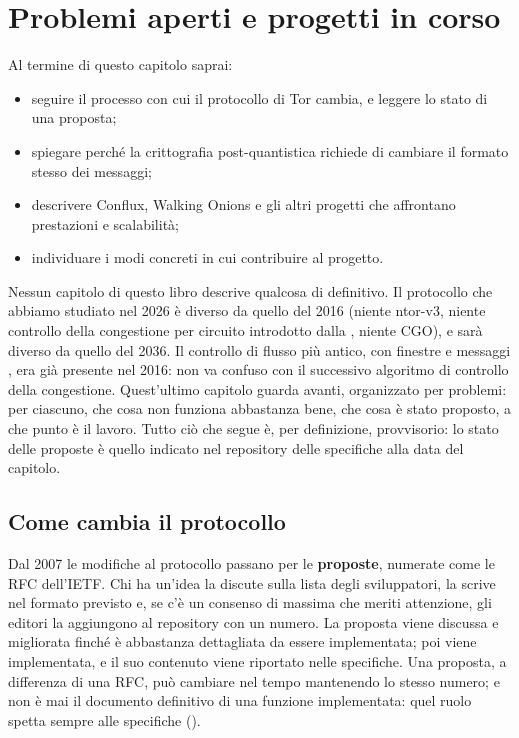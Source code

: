 \chapter{Problemi aperti e progetti in corso}\label{cap:31-futuro}

\begin{obiettivi}
Al termine di questo capitolo saprai:
\begin{itemize}[nosep]
  \item seguire il processo con cui il protocollo di Tor cambia, e leggere lo stato di una proposta;
  \item spiegare perché la crittografia post-quantistica richiede di cambiare il formato stesso dei messaggi;
  \item descrivere Conflux, Walking Onions e gli altri progetti che affrontano prestazioni e scalabilità;
  \item individuare i modi concreti in cui contribuire al progetto.
\end{itemize}
\end{obiettivi}

Nessun capitolo di questo libro descrive qualcosa di definitivo. Il protocollo che abbiamo studiato nel 2026 è diverso da quello del 2016 (niente ntor-v3, niente controllo della congestione per circuito introdotto dalla , niente CGO), e sarà diverso da quello del 2036. Il controllo di flusso più antico, con finestre e messaggi , era già presente nel 2016: non va confuso con il successivo algoritmo di controllo della congestione. Quest'ultimo capitolo guarda avanti, organizzato per problemi: per ciascuno, che cosa non funziona abbastanza bene, che cosa è stato proposto, a che punto è il lavoro. Tutto ciò che segue è, per definizione, provvisorio: lo stato delle proposte è quello indicato nel repository delle specifiche alla data del capitolo.

\section{Come cambia il protocollo}\label{sec:fut-processo}

Dal 2007 le modifiche al protocollo passano per le \textbf{proposte}, numerate come le RFC dell'IETF. Chi ha un'idea la discute sulla lista degli sviluppatori, la scrive nel formato previsto e, se c'è un consenso di massima che meriti attenzione, gli editori la aggiungono al repository con un numero. La proposta viene discussa e migliorata finché è abbastanza dettagliata da essere implementata; poi viene implementata, e il suo contenuto viene riportato nelle specifiche. Una proposta, a differenza di una RFC, può cambiare nel tempo mantenendo lo stesso numero; e non è mai il documento definitivo di una funzione implementata: quel ruolo spetta sempre alle specifiche ().

